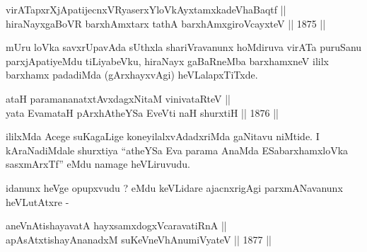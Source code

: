 
\begin{shl}
virATapxrXjApatijecnxVRyaserxYloVkAyxtamxkadeVhaBaqtf || \\
hiraNayxgaBoVR barxhAmx\s tarx tathA barxhAmxgiroVcayxteV ||  1875 ||  
\end{shl}

\begin{artha}
mUru loVka savxrUpavAda sUthxla shariVravanunx hoMdiruva virATa
puruSanu parxjApatiyeMdu tiLiyabeVku, hiraNayx gaBaRneMba barxhamxneV
ililx barxhamx padadiMda (gArxhayxvAgi) heVLalapxTiTxde.
\end{artha}


\begin{shl}
ataH paramananatxtAvxdagxNitaM vinivataRteV || \\
yata EvamataH pArxhAtheYSa EveVti naH shurxtiH ||  1876 ||  
\end{shl}

\begin{artha}
ililxMda Acege suKagaLige koneyilalxvAdadxriMda gaNitavu niMtide. I
kAraNadiMdale shurxtiya ``atheYSa Eva parama AnaMda ESabarxhamxloVka
sasxmArxTf'' eMdu namage heVLiruvudu.
\end{artha}

\begin{artha}
idanunx heVge opupxvudu ? eMdu keVLidare ajacnxrigAgi parxmANavanunx heVLutAtxre -
\end{artha}

\begin{shl}
aneVnAtishayavatA hayxsamxdogxVcaravatiRnA || \\
apAsAtxtishayAnanadxM suKeVneVhAnumiVyateV ||  1877 ||  
\end{shl}

